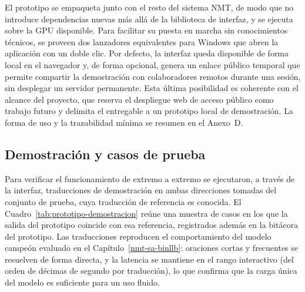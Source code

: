 \documentclass[12pt,a4paper,oneside]{book}
\begin{document}
El prototipo se empaqueta junto con el resto del sistema NMT, de modo que no introduce dependencias nuevas más allá de la biblioteca de interfaz, y se ejecuta sobre la GPU disponible. Para facilitar su puesta en marcha sin conocimientos técnicos, se proveen dos lanzadores equivalentes para Windows que abren la aplicación con un doble clic. Por defecto, la interfaz queda disponible de forma local en el navegador y, de forma opcional, genera un enlace público temporal que permite compartir la demostración con colaboradores remotos durante una sesión, sin desplegar un servidor permanente. Esta última posibilidad es coherente con el alcance del proyecto, que reserva el despliegue web de acceso público como trabajo futuro y delimita el entregable a un prototipo local de demostración. La forma de uso y la trazabilidad mínima se resumen en el Anexo~D.

\subsection{Demostración y casos de prueba}\label{prototipo-demostracion}

Para verificar el funcionamiento de extremo a extremo se ejecutaron, a través de la interfaz, traducciones de demostración en ambas direcciones tomadas del conjunto de prueba, cuya traducción de referencia es conocida. El Cuadro~\ref{tab:prototipo-demostracion} reúne una muestra de casos en los que la salida del prototipo coincide con esa referencia, registrados además en la bitácora del prototipo. Las traducciones reproducen el comportamiento del modelo campeón evaluado en el Capítulo~\ref{nmt-sa-binllb}: oraciones cortas y frecuentes se resuelven de forma directa, y la latencia se mantiene en el rango interactivo (del orden de décimas de segundo por traducción), lo que confirma que la carga única del modelo es suficiente para un uso fluido.

\begin{table}[h]
\centering
\caption{Casos de prueba de demostración en ambas direcciones, tomados del conjunto de prueba de la variante \texttt{xl}, en los que la salida del prototipo coincide con la traducción de referencia (modelo \(v_{2.1b}\) con reranking, \(\alpha=0{,}7\)).}
\label{tab:prototipo-demostracion}
\end{table}
\end{document}
